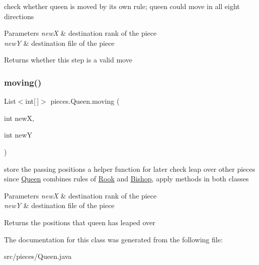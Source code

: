 check whether queen is moved by its own rule; queen could move in all eight directions 
\begin{DoxyParams}{Parameters}
{\em newX} & destination rank of the piece \\
\hline
{\em newY} & destination file of the piece \\
\hline
\end{DoxyParams}
\begin{DoxyReturn}{Returns}
whether this step is a valid move 
\end{DoxyReturn}
\mbox{\label{classpieces_1_1_queen_a2e0d378c18cf3fd85dc1acf860294950}} 
\subsubsection{\texorpdfstring{moving()}{moving()}}
{\footnotesize\ttfamily List$<$int\mbox{[}$\,$\mbox{]}$>$ pieces.\+Queen.\+moving (\begin{DoxyParamCaption}\item[{int}]{newX,  }\item[{int}]{newY }\end{DoxyParamCaption})\hspace{0.3cm}{\ttfamily [inline]}}

store the passing positions a helper function for later check leap over other pieces since \mbox{\hyperlink{classpieces_1_1_queen}{Queen}} combines rules of \mbox{\hyperlink{classpieces_1_1_rook}{Rook}} and \mbox{\hyperlink{classpieces_1_1_bishop}{Bishop}}, apply methods in both classes 
\begin{DoxyParams}{Parameters}
{\em newX} & destination rank of the piece \\
\hline
{\em newY} & destination file of the piece \\
\hline
\end{DoxyParams}
\begin{DoxyReturn}{Returns}
the positions that queen has leaped over 
\end{DoxyReturn}


The documentation for this class was generated from the following file\+:\begin{DoxyCompactItemize}
\item 
src/pieces/Queen.\+java\end{DoxyCompactItemize}
